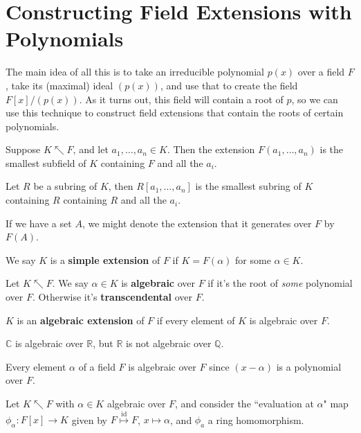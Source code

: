 \documentclass[10pt]{report}
\begin{document}

\section{Constructing Field Extensions with Polynomials}

The main idea of all this is to take an irreducible polynomial $p(x)$ over a field $F$, take its {\color{red}(maximal)} ideal $(p(x))$, and use that to create the field $F[x]/(p(x))$. As it turns out, this field will contain a root of $p$, so we can use this technique to construct field extensions that contain the roots of certain polynomials.

\begin{defn}[]
	Suppose $K \nwarrow F$, and let $a_1, \dots, a_n \in K$. Then the extension $F(a_1, \dots, a_n)$ is the smallest subfield of $K$ containing $F$ and all the $a_i$.

	Let $R$ be a subring of $K$, then $R[a_1, \dots, a_n]$ is the smallest subring of $K$ containing $R$ containing $R$ and all the $a_i$.
\end{defn}

If we have a set $A$, we might denote the extension that it generates over $F$ by $F(A)$.

We say $K$ is a \textbf{simple extension} of $F$ if $K=F(\alpha)$ for some $\alpha \in K$.

\begin{defn}[]
	Let $K \nwarrow F$. We say $\alpha \in K$ is \textbf{algebraic} over $F$ if it's the root of \textit{some} polynomial over $F$. Otherwise it's \textbf{transcendental} over $F$.

	$K$ is an \textbf{algebraic extension} of $F$ if every element of $K$ is algebraic over $F$.
\end{defn}

\begin{ex}[]
$\mathbb{C}$ is algebraic over $\mathbb{R}$, but $\mathbb{R}$ is not algebraic over $\mathbb{Q}$.
\end{ex}

\begin{ex}[]
	Every element $\alpha$ of a field $F$ is algebraic over $F$ since $(x-\alpha)$ is a polynomial over $F$.
\end{ex}

Let $K \nwarrow F$ with $\alpha \in K$ algebraic over $F$, and consider the ``evaluation at $\alpha$" map $\phi_\alpha:F[x]\to K$ given by $F \stackrel{\text{id}}{\mapsto } F$, $x \mapsto \alpha$, and $\phi_a$ a ring homomorphism.
\end{document}
